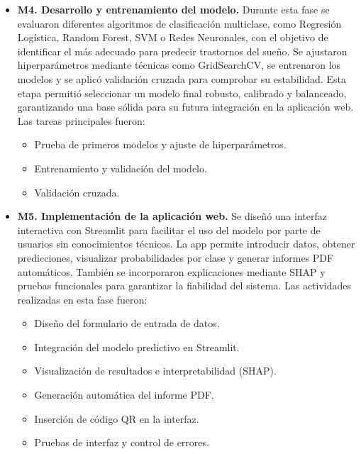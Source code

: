 \begin{itemize}
  \begin{itemize}
    \item Extracción de características y codificación de variables categóricas.
    \item Preprocesamiento y estructuración del dataset.
    \item Identificación y análisis de outliers.
    \item Análisis de correlaciones.
  \end{itemize}

  \item \textbf{M4. Desarrollo y entrenamiento del modelo.}
  Durante esta fase se evaluaron diferentes algoritmos de clasificación multiclase, como Regresión Logística, Random Forest, SVM o Redes Neuronales, con el objetivo de identificar el más adecuado para predecir trastornos del sueño. Se ajustaron hiperparámetros mediante técnicas como GridSearchCV, se entrenaron los modelos y se aplicó validación cruzada para comprobar su estabilidad. Esta etapa permitió seleccionar un modelo final robusto, calibrado y balanceado, garantizando una base sólida para su futura integración en la aplicación web.
   Las tareas principales fueron:
   
  \begin{itemize}
    \item Prueba de primeros modelos y ajuste de hiperparámetros.
    \item Entrenamiento y validación del modelo.
    \item Validación cruzada.
  \end{itemize}

  \item \textbf{M5. Implementación de la aplicación web.}
  Se diseñó una interfaz interactiva con Streamlit para facilitar el uso del modelo por parte de usuarios sin conocimientos técnicos. La app permite introducir datos, obtener predicciones, visualizar probabilidades por clase y generar informes PDF automáticos. También se incorporaron explicaciones mediante SHAP y pruebas funcionales para garantizar la fiabilidad del sistema.  
  Las actividades realizadas en esta fase fueron:
  
  \begin{itemize}
    \item Diseño del formulario de entrada de datos.
    \item Integración del modelo predictivo en Streamlit.
    \item Visualización de resultados e interpretabilidad (SHAP).
    \item Generación automática del informe PDF.
    \item Inserción de código QR en la interfaz.
    \item Pruebas de interfaz y control de errores.
  \end{itemize}


\end{itemize}
